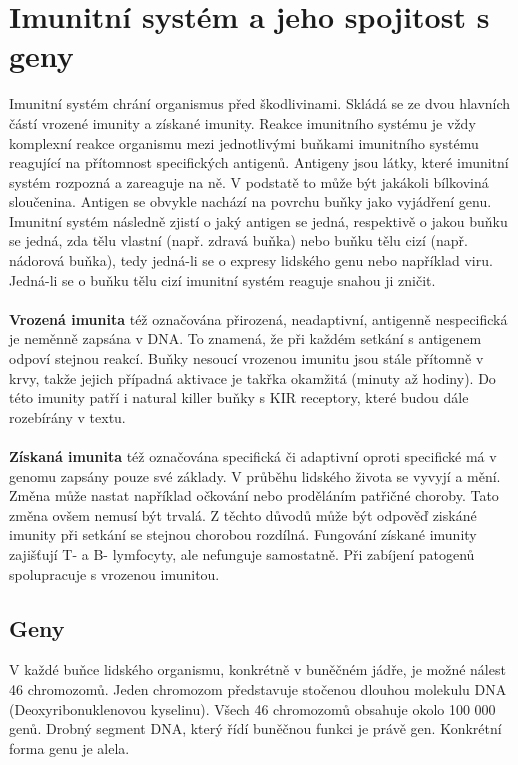 \documentclass[czech,DP]{thesiskiv}
\numberwithin{equation}{section}
\begin{document}
\chapter{Imunitní systém a jeho spojitost s geny}
Imunitní systém chrání organismus před škodlivinami. Skládá se ze dvou hlavních částí vrozené imunity a získané imunity. Reakce imunitního systému je vždy komplexní reakce organismu mezi jednotlivými buňkami imunitního systému reagující na přítomnost specifických antigenů. Antigeny jsou látky, které imunitní systém rozpozná a zareaguje na ně. V podstatě to může být jakákoli bílkoviná sloučenina. Antigen se obvykle nachází na povrchu buňky jako vyjádření genu. Imunitní systém následně zjistí o jaký antigen se jedná, respektivě o jakou buňku se jedná, zda tělu vlastní (např. zdravá buňka) nebo buňku tělu cizí (např. nádorová buňka), tedy jedná-li se o expresy lidského genu nebo například viru. Jedná-li se o buňku tělu cizí imunitní systém reaguje snahou ji zničit. 
\\
\\
\textbf{Vrozená imunita} též označována přirozená, neadaptivní, antigenně nespecifická je neměnně zapsána v DNA. To znamená, že při každém setkání s antigenem odpoví stejnou reakcí. Buňky nesoucí vrozenou imunitu jsou stále přítomně v krvy, takže jejich případná aktivace je takřka okamžitá (minuty až hodiny). Do této imunity patří i natural killer buňky s KIR receptory, které budou dále rozebírány v textu. 
\\
\\
\textbf{Získaná imunita} též označována specifická či adaptivní oproti specifické má v genomu zapsány pouze své základy. V průběhu lidského života se vyvyjí a mění. Změna může nastat například očkování nebo proděláním patřičné choroby. Tato změna ovšem nemusí být trvalá. Z těchto důvodů může být odpověď ziskáné imunity při setkání se stejnou chorobou rozdílná. Fungování získané imunity zajišťují T- a B- lymfocyty, ale nefunguje samostatně. Při zabíjení patogenů spolupracuje s vrozenou imunitou.

\section{Geny}
V každé buňce lidského organismu, konkrétně v buněčném jádře, je možné nálest 46 chromozomů. Jeden chromozom představuje stočenou dlouhou molekulu DNA (Deoxyribonuklenovou kyselinu). Všech 46 chromozomů obsahuje okolo 100 000 genů. Drobný segment DNA, který řídí buněčnou funkci je právě gen. Konkrétní forma genu je alela. \citep{en_smith}
\end{document}
